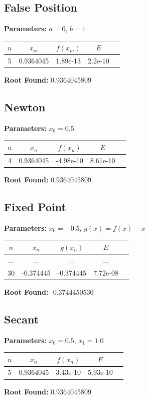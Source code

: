 \documentclass[12pt,a4paper]{article}
\begin{document}
\subsection{False Position}
\textbf{Parameters:} $a = 0$, $b = 1$
\begin{center}
\begin{tabular}{c c c c c}
\toprule
$n$ & $x_m$ & $f(x_m)$ & $E$ \\
\midrule
5 & 0.9364045 & 1.89e-13 & 2.2e-10 \\
\bottomrule
\end{tabular}
\end{center}
\textbf{Root Found:} 0.9364045809

\subsection{Newton}
\textbf{Parameters:} $x_0 = 0.5$
\begin{center}
\begin{tabular}{c c c c c}
\toprule
$n$ & $x_n$ & $f(x_n)$ & $E$ \\
\midrule
4 & 0.9364045 & -4.98e-10 & 8.61e-10 \\
\bottomrule
\end{tabular}
\end{center}
\textbf{Root Found:} 0.9364045809

\subsection{Fixed Point}
\textbf{Parameters:} $x_0 = -0.5$, $g(x) = f(x) - x$
\begin{center}
\begin{tabular}{c c c c c}
\toprule
$n$ & $x_n$ & $g(x_n)$ & $E$ \\
\midrule
... & ... & ... & ... \\
30 & -0.374445 & -0.374445 & 7.72e-08 \\
\bottomrule
\end{tabular}
\end{center}
\textbf{Root Found:} -0.3744450530

\subsection{Secant}
\textbf{Parameters:} $x_0 = 0.5$, $x_1 = 1.0$
\begin{center}
\begin{tabular}{c c c c c}
\toprule
$n$ & $x_n$ & $f(x_n)$ & $E$ \\
\midrule
5 & 0.9364045 & 3.43e-10 & 5.93e-10 \\
\bottomrule
\end{tabular}
\end{center}
\textbf{Root Found:} 0.9364045809
\end{document}
